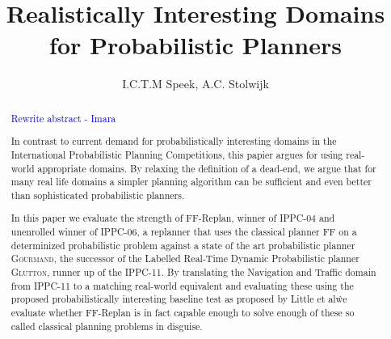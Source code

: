 \documentclass[runningheads,a4paper]{llncs}
\newcommand\todo[1]{\textcolor{blue}{#1}}
\begin{document}
\mainmatter%

\title{Realistically Interesting Domains for Probabilistic Planners}


\author{I.C.T.M Speek, A.C. Stolwijk}

%



\maketitle



\begin{abstract}

\todo{Rewrite abstract - Imara}

	In contrast to current demand for probabilistically interesting domains in the International Probabilistic Planning Competitions, this papier argues for using real-world appropriate domains. By relaxing the definition of a dead-end, we argue that for many
real life domains a simpler planning algorithm can be sufficient and even better than sophisticated probabilistic planners.

In this paper we evaluate the strength of FF-Replan, winner of IPPC-04 and unenrolled winner of IPPC-06, a replanner that uses the classical planner FF on a determinized probabilistic problem against a state of the art probabilistic planner \textsc{Gourmand}, the successor of the Labelled Real-Time Dynamic Probabilistic planner \textsc{Glutton}, runner up of the IPPC-11. By translating the Navigation and Traffic domain from IPPC-11 to a matching real-world equivalent and evaluating these using the proposed probabilistically interesting baseline test as proposed by Little et al\. we evaluate whether FF-Replan is in fact capable enough to solve enough of these so called classical planning problems in disguise.
\end{abstract}
\end{document}
